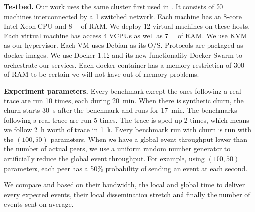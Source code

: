 \par
\textbf{Testbed.}  Our work uses the same cluster first used in \autocite{vaucher2016erasure}. It consists of 20 machines interconnected by a \SI{1}{\gbps} switched network. Each machine has an 8-core Intel Xeon CPU and \SI{8}{\giga\byte} of RAM. We deploy 12 virtual machines on these hosts. Each virtual machine has access 4 VCPUs as well as \SI{7}{\giga\byte} of RAM. We use KVM as our hypervisor. Each VM uses Debian as its O/S. Protocols are packaged as docker images. We use Docker 1.12 and its new functionality Docker Swarm to orchestrate our services. Each docker container has a memory restriction of \SI{300}{\mega\byte} of RAM to be certain we will not have out of memory problems.
\par
\textbf{Experiment parameters.} Every benchmark except the ones following a real trace are run 10 times, each during \SI{20}{\minute}. When there is synthetic churn, the churn starts \SI{30}{\second} after the benchmark and runs for \SI{17}{\minute}. The benchmarks following a real trace are run 5 times. The trace is sped-up 2 times, which means we follow \SI{2}{\hour} worth of trace in \SI{1}{\hour}. Every benchmark run with churn is run with the $(100,50)$ parameters. When we have a global event throughput lower than the number of actual peers, we use a uniform random number generator to artificially reduce the global event throughput. For example, using $(100,50)$ parameters, each peer has a 50\% probability of sending an event at each second.
\par
We compare \epto and \jgroups based on their bandwidth, the local and global time to deliver every expected events, their local dissemination stretch and finally the number of events sent on average.

